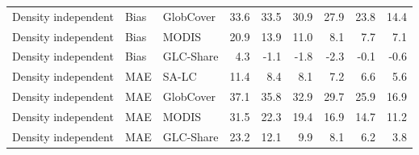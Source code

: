 \begin{longtable}{lllrrrrrr}
  Density independent & Bias & GlobCover & 33.6 & 33.5 & 30.9 & 27.9 & 23.8 & 14.4 \\ 
  Density independent & Bias & MODIS & 20.9 & 13.9 & 11.0 & 8.1 & 7.7 & 7.1 \\ 
  Density independent & Bias & GLC-Share & 4.3 & -1.1 & -1.8 & -2.3 & -0.1 & -0.6 \\ 
  Density independent & MAE & SA-LC & 11.4 & 8.4 & 8.1 & 7.2 & 6.6 & 5.6 \\ 
  Density independent & MAE & GlobCover & 37.1 & 35.8 & 32.9 & 29.7 & 25.9 & 16.9 \\ 
  Density independent & MAE & MODIS & 31.5 & 22.3 & 19.4 & 16.9 & 14.7 & 11.2 \\ 
  Density independent & MAE & GLC-Share & 23.2 & 12.1 & 9.9 & 8.1 & 6.2 & 3.8 \\ 
   \hline
\hline
\end{longtable}
